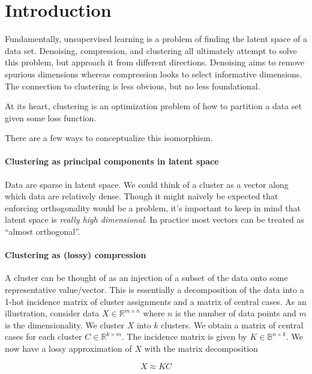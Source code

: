 \section{Introduction}
Fundamentally, unsupervised learning is a problem of finding the latent space of a data set.
Denoising, compression, and clustering all ultimately attempt to solve this problem, but approach it from different directions.
Denoising aims to remove spurious dimensions whereas compression looks to select informative dimensions.
The connection to clustering is less obvious, but no less foundational\cite{9830658}.


At its heart, clustering is an optimization problem of how to partition a data set given some loss function.

There are a few ways to conceptualize this isomorphism.

\paragraph{Clustering as principal components in latent space}
Data are sparse in latent space.
We could think of a cluster as a vector along which data are relatively dense.
Though it might na\"ively be expected that enforcing orthogonality would be a problem,  
it's important to keep in mind that latent space is \textit{really high dimensional}.
In practice most vectors can be treated as ``almost orthogonal''.

\paragraph{Clustering as (lossy) compression}
A cluster can be thought of as an injection of a subset of the data onto some representative value/vector.
This is essentially a decomposition of the data into a 1-hot incidence matrix of cluster assignments and a matrix of central cases.
As an illustration, consider data $X \in \mathbb{R}^{m \times n}$ where $n$ is the number of data points and $m$ is the dimensionality.
We cluster $X$ into $k$ clusters.
We obtain a matrix of central cases for each cluster $C \in \mathbb{R}^{k \times m}$.
The incidence matrix is given by $K \in \mathbb{B}^{n \times k}$.
We now have a lossy approximation of $X$ with the matrix decomposition

\begin{equation}
  X \approx KC
\end{equation}

